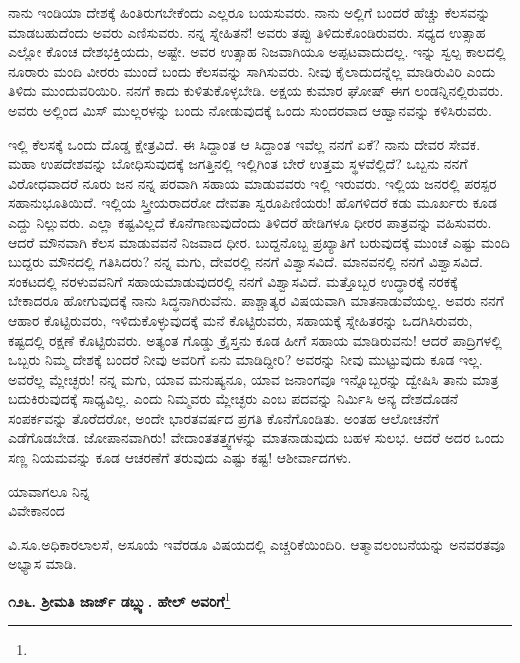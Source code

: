 ನಾನು ಇಂಡಿಯಾ ದೇಶಕ್ಕೆ ಹಿಂತಿರುಗಬೇಕೆಂದು ಎಲ್ಲರೂ ಬಯಸುವರು. ನಾನು ಅಲ್ಲಿಗೆ ಬಂದರೆ ಹೆಚ್ಚು ಕೆಲಸವನ್ನು ಮಾಡಬಹುದೆಂದು ಅವರು ಎಣಿಸುವರು. ನನ್ನ ಸ್ನೇಹಿತನೆ! ಅವರು ತಪ್ಪು ತಿಳಿದುಕೊಂಡಿರುವರು. ಸಧ್ಯದ ಉತ್ಸಾಹ ಎಲ್ಲೋ ಕೊಂಚ ದೇಶಭಕ್ತಿಯದು, ಅಷ್ಟೇ. ಅವರ ಉತ್ಸಾಹ ನಿಜವಾಗಿಯೂ ಅಪ್ಪಟವಾದುದಲ್ಲ. ಇನ್ನು ಸ್ವಲ್ಪ ಕಾಲದಲ್ಲಿ ನೂರಾರು ಮಂದಿ ವೀರರು ಮುಂದೆ ಬಂದು ಕೆಲಸವನ್ನು ಸಾಗಿಸುವರು. ನೀವು ಕೈಲಾದುದನ್ನೆಲ್ಲ ಮಾಡಿರುವಿರಿ ಎಂದು ತಿಳಿದು ಮುಂದುವರಿಯಿರಿ. ನನಗೆ ಕಾದು ಕುಳಿತುಕೊಳ್ಳಬೇಡಿ. ಅಕ್ಷಯ ಕುಮಾರ ಘೋಷ್ ಈಗ ಲಂಡನ್ನಿನಲ್ಲಿರುವರು. ಅವರು ಅಲ್ಲಿಂದ ಮಿಸ್ ಮುಲ್ಲರಳನ್ನು ಬಂದು ನೋಡುವುದಕ್ಕೆ ಒಂದು ಸುಂದರವಾದ ಆಹ್ವಾನವನ್ನು ಕಳಿಸಿರುವರು.

ಇಲ್ಲಿ ಕೆಲಸಕ್ಕೆ ಒಂದು ದೊಡ್ಡ ಕ್ಷೇತ್ರವಿದೆ. ಈ ಸಿದ್ದಾಂತ ಆ ಸಿದ್ದಾಂತ ಇವೆಲ್ಲ ನನಗೆ ಏಕೆ? ನಾನು ದೇವರ ಸೇವಕ. ಮಹಾ ಉಪದೇಶವನ್ನು ಬೋಧಿಸುವುದಕ್ಕೆ ಜಗತ್ತಿನಲ್ಲಿ ಇಲ್ಲಿಗಿಂತ ಬೇರೆ ಉತ್ತಮ ಸ್ಥಳವೆಲ್ಲಿದೆ? ಒಬ್ಬನು ನನಗೆ ವಿರೋಧವಾದರೆ ನೂರು ಜನ ನನ್ನ ಪರವಾಗಿ ಸಹಾಯ ಮಾಡುವವರು ಇಲ್ಲಿ ಇರುವರು. ಇಲ್ಲಿಯ ಜನರಲ್ಲಿ ಪರಸ್ಪರ ಸಹಾನುಭೂತಿಯಿದೆ. ಇಲ್ಲಿಯ ಸ್ತ್ರೀಯರಾದರೋ ದೇವತಾ ಸ್ವರೂಪಿಣಿಯರು! ಹೊಗಳಿದರೆ ಕಡು ಮೂರ್ಖರು ಕೂಡ ಎದ್ದು ನಿಲ್ಲುವರು. ಎಲ್ಲಾ ಕಷ್ಟವಿಲ್ಲದೆ ಕೊನೆಗಾಣುವುದೆಂದು ತಿಳಿದರೆ ಹೇಡಿಗಳೂ ಧೀರರ ಪಾತ್ರವನ್ನು ವಹಿಸುವರು. ಆದರೆ ಮೌನವಾಗಿ ಕೆಲಸ ಮಾಡುವವನೆ ನಿಜವಾದ ಧೀರ. ಬುದ್ದನೊಬ್ಬ ಪ್ರಖ್ಯಾತಿಗೆ ಬರುವುದಕ್ಕೆ ಮುಂಚೆ ಎಷ್ಟು ಮಂದಿ ಬುದ್ದರು ಮೌನದಲ್ಲಿ ಗತಿಸಿದರು? ನನ್ನ ಮಗು, ದೇವರಲ್ಲಿ ನನಗೆ ವಿಶ್ವಾಸವಿದೆ. ಮಾನವನಲ್ಲಿ ನನಗೆ ವಿಶ್ವಾಸವಿದೆ. ಸಂಕಟದಲ್ಲಿ ನರಳುವವನಿಗೆ ಸಹಾಯಮಾಡುವುದರಲ್ಲಿ ನನಗೆ ವಿಶ್ವಾಸವಿದೆ. ಮತ್ತೊಬ್ಬರ ಉದ್ಧಾರಕ್ಕೆ ನರಕಕ್ಕೆ ಬೇಕಾದರೂ ಹೋಗುವುದಕ್ಕೆ ನಾನು ಸಿದ್ಧನಾಗಿರುವೆನು. ಪಾಶ್ಚಾತ್ಯರ ವಿಷಯವಾಗಿ ಮಾತನಾಡುವೆಯಲ್ಲ. ಅವರು ನನಗೆ ಆಹಾರ ಕೊಟ್ಟಿರುವರು, ಇಳಿದುಕೊಳ್ಳುವುದಕ್ಕೆ ಮನೆ ಕೊಟ್ಟಿರುವರು, ಸಹಾಯಕ್ಕೆ ಸ್ನೇಹಿತರನ್ನು ಒದಗಿಸಿರುವರು, ಕಷ್ಟದಲ್ಲಿ ರಕ್ಷಣೆ ಕೊಟ್ಟಿರುವರು. ಅತ್ಯಂತ ಗೊಡ್ಡು ಕ್ರೈಸ್ತನು ಕೂಡ ಹೀಗೆ ಸಹಾಯ ಮಾಡಿರುವನು! ಆದರೆ ಪಾದ್ರಿಗಳಲ್ಲಿ ಒಬ್ಬರು ನಿಮ್ಮ ದೇಶಕ್ಕೆ ಬಂದರೆ ನೀವು ಅವರಿಗೆ ಏನು ಮಾಡಿದ್ದೀರಿ? ಅವರನ್ನು ನೀವು ಮುಟ್ಟುವುದು ಕೂಡ ಇಲ್ಲ. ಅವರೆಲ್ಲ ಮ್ಲೇಚ್ಛರು! ನನ್ನ ಮಗು, ಯಾವ ಮನುಷ್ಯನೂ, ಯಾವ ಜನಾಂಗವೂ ಇನ್ನೊಬ್ಬರನ್ನು ದ್ವೇಷಿಸಿ ತಾನು ಮಾತ್ರ ಬದುಕಿರುವುದಕ್ಕೆ ಸಾಧ್ಯವಿಲ್ಲ. ಎಂದು ನಿಮ್ಮವರು ಮ್ಲೇಚ್ಛರು ಎಂಬ ಪದವನ್ನು ನಿರ್ಮಿಸಿ ಅನ್ಯ ದೇಶದೊಡನೆ ಸಂಪರ್ಕವನ್ನು ತೊರೆದರೋ, ಅಂದೇ ಭಾರತವರ್ಷದ ಪ್ರಗತಿ ಕೊನೆಗೊಂಡಿತು. ಅಂತಹ ಆಲೋಚನೆಗೆ ಎಡೆಗೊಡಬೇಡ. ಜೋಪಾನವಾಗಿರು! ವೇದಾಂತತತ್ತ್ವಗಳನ್ನು ಮಾತನಾಡುವುದು ಬಹಳ ಸುಲಭ. ಆದರೆ ಅದರ ಒಂದು ಸಣ್ಣ ನಿಯಮವನ್ನು ಕೂಡ ಆಚರಣೆಗೆ ತರುವುದು ಎಷ್ಟು ಕಷ್ಟ! ಆಶೀರ್ವಾದಗಳು.

\vspace{-0.5cm}

\begin{flushright}
ಯಾವಾಗಲೂ ನಿನ್ನ\\ವಿವೇಕಾನಂದ
\end{flushright}

ವಿ.ಸೂ.\enginline{-}ಅಧಿಕಾರಲಾಲಸೆ, ಅಸೂಯೆ ಇವೆರಡೂ ವಿಷಯದಲ್ಲಿ ಎಚ್ಚರಿಕೆಯಿಂದಿರಿ. ಆತ್ಮಾವಲಂಬನೆಯನ್ನು ಅನವರತವೂ ಅಭ್ಯಾಸ ಮಾಡಿ.

\begin{center}
\textbf{೧೨೬. ಶ‍್ರೀಮತಿ ಜಾರ್ಜ್ ಡಬ್ಲ್ಯು. ಹೇಲ್‌ ಅವರಿಗೆ}\footnote{}
\end{center}

